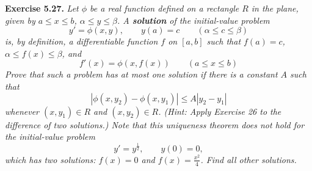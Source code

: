 \documentclass{article}
\begin{document}



\textbf{Exercise 5.27.}
\emph{Let $\phi$ be a real function defined on a rectangle $R$ in the plane,
given by $a \leq x \leq b$, $\alpha \leq y \leq \beta$.
A \textbf{solution} of the initial-value problem
\[
  y' = \phi(x,y), \qquad y(a) = c \qquad (\alpha \leq c \leq \beta)
\]
is, by definition, a differentiable function $f$ on $[a,b]$ such that
$f(a) = c$, $\alpha \leq f(x) \leq \beta$, and
\[
  f'(x) = \phi(x,f(x)) \qquad (a \leq x \leq b)
\]
Prove that such a problem has at most one solution if there is a constant $A$ such that
\[
  |\phi(x,y_2) - \phi(x,y_1)| \leq A|y_2 - y_1|
\]
whenever $(x,y_1) \in R$ and $(x,y_2) \in R$.
(Hint: Apply Exercise 26 to the difference of two solutions.)
Note that this uniqueness theorem does not hold for the initial-value problem
\[
  y' = y^{\frac{1}{2}}, \qquad y(0) = 0,
\]
which has two solutions: $f(x) = 0$ and $f(x) = \frac{x^2}{4}$.
Find all other solutions.} \\
\end{document}
